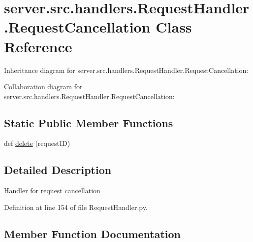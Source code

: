 \hypertarget{classserver_1_1src_1_1handlers_1_1_request_handler_1_1_request_cancellation}{}\section{server.\+src.\+handlers.\+Request\+Handler.\+Request\+Cancellation Class Reference}
\label{classserver_1_1src_1_1handlers_1_1_request_handler_1_1_request_cancellation}


Inheritance diagram for server.\+src.\+handlers.\+Request\+Handler.\+Request\+Cancellation\+:


Collaboration diagram for server.\+src.\+handlers.\+Request\+Handler.\+Request\+Cancellation\+:
\subsection*{Static Public Member Functions}
\begin{DoxyCompactItemize}
\item 
def \hyperlink{classserver_1_1src_1_1handlers_1_1_request_handler_1_1_request_cancellation_aa24a7e9c1cea6399f9208b0eb4292954}{delete} (request\+ID)
\end{DoxyCompactItemize}


\subsection{Detailed Description}
\begin{DoxyVerb}Handler for request cancellation\end{DoxyVerb}
 

Definition at line 154 of file Request\+Handler.\+py.



\subsection{Member Function Documentation}
